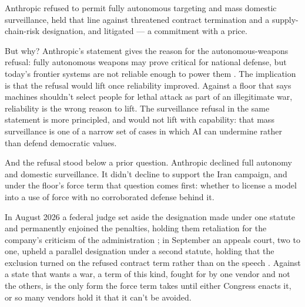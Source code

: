 
Anthropic refused to permit fully autonomous targeting and mass domestic surveillance, held that line against threatened contract termination and a supply-chain-risk designation, and litigated \autocite{crs2026pentagon} — a commitment with a price.

But why? Anthropic's statement gives the reason for the autonomous-weapons refusal: fully autonomous weapons may prove critical for national defense, but today's frontier systems are not reliable enough to power them \autocite{Amodei2026DoWStatement}. The implication is that the refusal would lift once reliability improved. Against a floor that says machines shouldn't select people for lethal attack as part of an illegitimate war, reliability is the wrong reason to lift. The surveillance refusal in the same statement is more principled, and would not lift with capability: that mass surveillance is one of a narrow set of cases in which AI can undermine rather than defend democratic values.

And the refusal stood below a prior question. Anthropic declined full autonomy and domestic surveillance. It didn't decline to support the Iran campaign, and under the floor's force term that question comes first: whether to license a model into a use of force with no corroborated defense behind it.

In August 2026 a federal judge set aside the designation made under one statute and permanently enjoined the penalties, holding them retaliation for the company's criticism of the administration \autocite{anthropic2026dow}; in September an appeals court, two to one, upheld a parallel designation under a second statute, holding that the exclusion turned on the refused contract term rather than on the speech \autocite{anthropic2026dowdccir}. Against a state that wants a war, a term of this kind, fought for by one vendor and not the others, is the only form the force term takes until either Congress enacts it, or so many vendors hold it that it can't be avoided.
